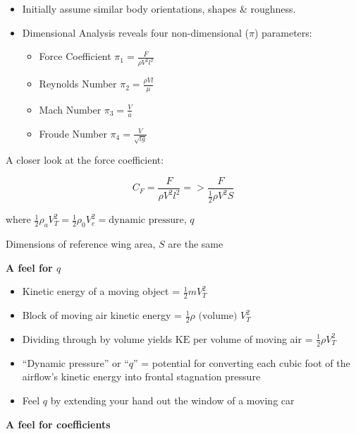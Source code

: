 \documentclass[
]{book}
\providecommand{\tightlist}{%
  \setlength{\itemsep}{0pt}\setlength{\parskip}{0pt}}
\begin{document}
\begin{itemize}
\tightlist
\item
  Initially assume similar body orientations, shapes \& roughness.
\item
  Dimensional Analysis reveals four non-dimensional (\(\pi\)) parameters:

  \begin{itemize}
  \tightlist
  \item
    Force Coefficient \(\pi_1 = \frac{F}{\rho V^2 l^2}\)
  \item
    Reynolds Number \(\pi_2 = \frac{\rho V l}{\mu}\)
  \item
    Mach Number \(\pi_3 = \frac{V}{a}\)
  \item
    Froude Number \(\pi_4 = \frac{V}{\sqrt{lg}}\)
  \end{itemize}
\end{itemize}

A closer look at the force coefficient:

\[C_F = \frac{F}{\rho V^2 l^2} => \frac{F}{\frac{1}{2} \rho V^2 S} \]

where \(\frac{1}{2} \rho_a V_T^2 = \frac{1}{2} \rho_0 V_e^2 = \text{dynamic pressure}\text{, }q\)

Dimensions of reference wing area, \(S\) are the same

\textbf{A feel for \(q\)}

\begin{itemize}
\tightlist
\item
  Kinetic energy of a moving object = \(\frac{1}{2} m V_T^2\)
\item
  Block of moving air kinetic energy = \(\frac{1}{2} \rho \text{ (volume) } V_T^2\)
\item
  Dividing through by volume yields \(\mathrm{KE}\) per volume of moving air = \(\frac{1}{2} \rho V_T^2\)
\item
  ``Dynamic pressure'' or ``\(q\)'' = potential for converting each cubic foot of the airflow's kinetic energy into frontal stagnation pressure
\item
  Feel \(q\) by extending your hand out the window of a moving car
\end{itemize}

\textbf{A feel for coefficients}
\end{document}
